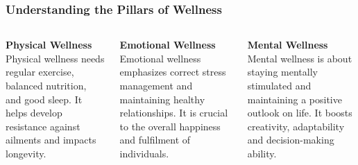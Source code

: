 \documentclass[5pt]{beamer}
\begin{document}
\begin{frame}
\frametitle{Understanding the Pillars of Wellness}
\begin{columns}
\begin{column}{0.3\textwidth}
\begin{block}{\textbf{Physical Wellness}}
Physical wellness needs regular exercise, balanced nutrition, and good sleep. It helps develop resistance against ailments and impacts longevity.
\end{block}
\end{column}
\begin{column}{0.3\textwidth}
\begin{block}{\textbf{Emotional Wellness}}
Emotional wellness emphasizes correct stress management and maintaining healthy relationships. It is crucial to the overall happiness and fulfilment of individuals.
\end{block}
\end{column}
\begin{column}{0.3\textwidth}
\begin{block}{\textbf{Mental Wellness}}
Mental wellness is about staying mentally stimulated and maintaining a positive outlook on life. It boosts creativity, adaptability and decision-making ability.
\end{block}
\end{column}
\end{columns}
\end{frame}
\end{document}
